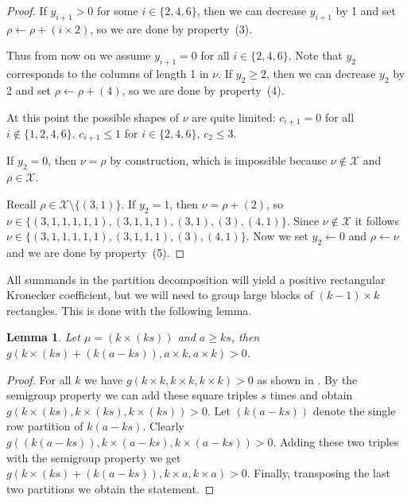 \documentclass{article}
\numberwithin{equation}{section}
\newtheorem{lemma}[equation]{Lemma}
\theoremstyle{definition}
\newcommand{\exceptions}{{\mathscr{X}}}
\begin{document}
\begin{proof}
If $y_{i+1}>0$ for some $i \in \{2,4,6\}$, then we can decrease $y_{i+1}$ by 1 and set $\rho \leftarrow \rho + (i \times 2)$,
so we are done by property~(3).

Thus from now on we assume $y_{i+1}=0$ for all $i \in \{2,4,6\}$.
Note that $y_2$ corresponds to the columns of length 1 in $\nu$.
If $y_2\geq 2$, then we can decrease $y_2$ by 2 and set $\rho \leftarrow \rho + (4)$,
so we are done by property~(4).

At this point the possible shapes of $\nu$ are quite limited:
$c_{i+1}=0$ for all $i \notin\{1,2,4,6\}$, $c_{i+1} \leq 1$ for $i \in \{2,4,6\}$, $c_{2}\leq 3$.

If $y_2 = 0$, then $\nu=\rho$ by construction, which is impossible because $\nu \notin \exceptions$ and $\rho \in \exceptions$.

Recall $\rho \in \exceptions \setminus\{(3,1)\}$.
If $y_2 = 1$, then $\nu = \rho+(2)$, so
$
\nu \in \{(3,1,1,1,1,1),(3,1,1,1),(3,1),(3),(4,1)\}.
$
Since $\nu \notin \exceptions$ it follows
$
\nu \in \{(3,1,1,1,1,1),(3,1,1,1),(3),(4,1)\}.
$
Now we set $y_2 \leftarrow 0$ and $\rho \leftarrow \nu$ and we are done by property~(5).
\end{proof}


All summands in the partition decomposition will yield a positive rectangular Kronecker coefficient,
but we will need to group large blocks of $(k-1)\times k$ rectangles.
This is done with the following lemma.
\begin{lemma}\label{lem:rect_pos}
Let   $\mu = (k \times (ks) )$ and $a \geq ks$, then $g( k \times (ks) + (k(a-ks)), a \times k, a \times k)>0$. 
\end{lemma}
\begin{proof}
For all $k$ we have $g( k \times k, k \times k, k \times k)>0$ as shown in \cite{bb}.
By the semigroup property we can add these square triples $s$ times and obtain
$g( k \times (ks), k \times (ks), k \times (ks) )>0.$
Let $(k(a-ks))$ denote the single row partition of $k(a-ks)$.
Clearly $g( (k(a-ks)), k \times (a-ks), k \times (a-ks) )>0$.
Adding these two triples with the semigroup property we get
$g( k \times (ks) + (k(a-ks)), k \times a, k \times a)>0.$
Finally, transposing the last two partitions
we obtain the statement.
\end{proof}
\end{document}
